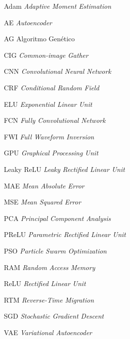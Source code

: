 \cleardoublepage

\makeatletter 

\makeatother  

\begin{siglas}
\item[Adam] \textit{Adaptive Moment Estimation}
\item[AE] \textit{Autoencoder}
\item[AG] Algoritmo Genético
\item[CIG] \textit{Common-image Gather}
\item[CNN] \textit{Convolutional Neural Network}
\item[CRF] \textit{Conditional Random Field}
\item[ELU] \textit{Exponential Linear Unit}
\item[FCN] \textit{Fully Convolutional Network}
\item[FWI] \textit{Full Waveform Inversion}
\item[GPU] \textit{Graphical Processing Unit}
\item[Leaky ReLU] \textit{Leaky Rectified Linear Unit}
\item[MAE] \textit{Mean Absolute Error}
\item[MSE] \textit{Mean Squared Error}
\item[PCA] \textit{Principal Component Analysis}
\item[PReLU] \textit{Parametric Rectified Linear Unit}
\item[PSO] \textit{Particle Swarm Optimization}
\item[RAM] \textit{Random Access Memory}
\item[ReLU] \textit{Rectified Linear Unit}
\item[RTM] \textit{Reverse-Time Migration}
\item[SGD] \textit{Stochastic Gradient Descent}
\item[VAE] \textit{Variational Autoencoder}

\end{siglas}

\cleardoublepage
\makeatletter
\@mkboth{\MakeUppercase\nomname}{\MakeUppercase\nomname}%
\makeatother
  
